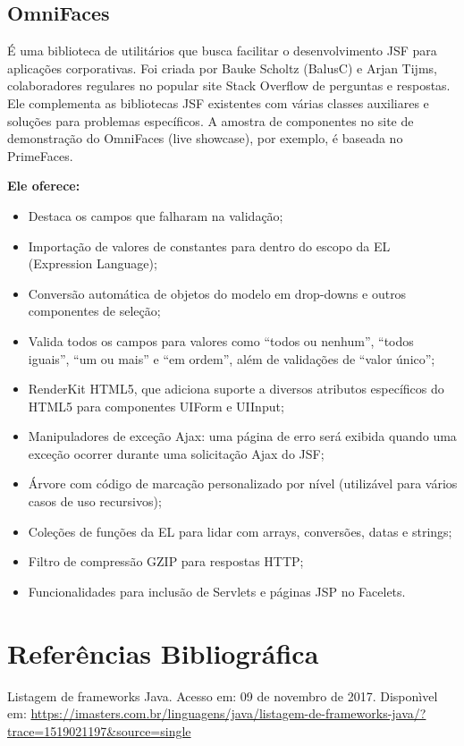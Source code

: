 \documentclass[12pt,a4paper]{article}
\begin{document}
\subsection{OmniFaces}
É uma biblioteca de utilitários que busca facilitar o desenvolvimento JSF para aplicações corporativas. Foi criada por Bauke Scholtz (BalusC) e Arjan Tijms, colaboradores regulares no popular site Stack Overflow de perguntas e respostas. Ele complementa as bibliotecas JSF existentes com várias classes auxiliares e soluções para problemas específicos. A amostra de componentes no site de demonstração do OmniFaces (live showcase), por exemplo, é baseada no PrimeFaces. 

\textbf{Ele oferece:}
\begin{itemize}
\item Destaca os campos que falharam na validação;

\item Importação de valores de constantes para dentro do escopo da EL (Expression Language);

\item Conversão automática de objetos do modelo em drop-downs e outros componentes de seleção;

\item Valida todos os campos para valores como “todos ou nenhum”, “todos iguais”, “um ou mais” e “em ordem”, além de validações de “valor único”;

\item RenderKit HTML5, que adiciona suporte a diversos atributos específicos do HTML5 para componentes UIForm e UIInput;

\item Manipuladores de exceção Ajax: uma página de erro será exibida quando uma exceção ocorrer durante uma solicitação Ajax do JSF;

\item Árvore com código de marcação personalizado por nível (utilizável para vários casos de uso recursivos);

\item Coleções de funções da EL para lidar com arrays, conversões, datas e strings;

\item Filtro de compressão GZIP para respostas HTTP;

\item Funcionalidades para inclusão de Servlets e páginas JSP no Facelets.

\end{itemize}

\section{Referências Bibliográfica}
\noindent 
Listagem de frameworks Java. Acesso em: 09 de novembro de 2017. Disponìvel em: \url {https://imasters.com.br/linguagens/java/listagem-de-frameworks-java/?trace=1519021197&source=single}
\\\vspace{0.2cm}
\end{document}

